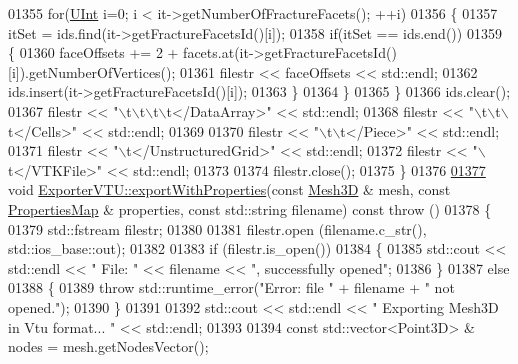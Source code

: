 \begin{DoxyCode}
01355         \textcolor{keywordflow}{for}(\hyperlink{namespaceFVCode3D_a4bf7e328c75d0fd504050d040ebe9eda}{UInt} i=0; i < it->getNumberOfFractureFacets(); ++i)
01356         \{
01357             itSet = ids.find(it->getFractureFacetsId()[i]);
01358             \textcolor{keywordflow}{if}(itSet == ids.end())
01359             \{
01360                 faceOffsets += 2 + facets.at(it->getFractureFacetsId()[i]).getNumberOfVertices();
01361                 filestr << faceOffsets << std::endl;
01362                 ids.insert(it->getFractureFacetsId()[i]);
01363             \}
01364         \}
01365     \}
01366     ids.clear();
01367     filestr << \textcolor{stringliteral}{"\(\backslash\)t\(\backslash\)t\(\backslash\)t\(\backslash\)t</DataArray>"} << std::endl;
01368     filestr << \textcolor{stringliteral}{"\(\backslash\)t\(\backslash\)t\(\backslash\)t</Cells>"} << std::endl;
01369 
01370     filestr << \textcolor{stringliteral}{"\(\backslash\)t\(\backslash\)t</Piece>"} << std::endl;
01371     filestr << \textcolor{stringliteral}{"\(\backslash\)t</UnstructuredGrid>"} << std::endl;
01372     filestr << \textcolor{stringliteral}{"\(\backslash\)t</VTKFile>"} << std::endl;
01373 
01374     filestr.close();
01375 \}
01376 
\hypertarget{ExportVTU_8cpp_source.tex_l01377}{}\hyperlink{classFVCode3D_1_1ExporterVTU_a0013b4e717db2c4719b00a5122f7b405}{01377} \textcolor{keywordtype}{void} \hyperlink{classFVCode3D_1_1ExporterVTU_a12240c4de9e7b3a5bf8f513c873c4547}{ExporterVTU::exportWithProperties}(\textcolor{keyword}{const} 
      \hyperlink{classFVCode3D_1_1Mesh3D}{Mesh3D} & mesh, \textcolor{keyword}{const} \hyperlink{classFVCode3D_1_1PropertiesMap}{PropertiesMap} & properties, \textcolor{keyword}{const} std::string filename) \textcolor{keyword}{const} \textcolor{keywordflow}{throw}
      ()
01378 \{
01379     std::fstream filestr;
01380 
01381     filestr.open (filename.c\_str(), std::ios\_base::out);
01382 
01383     \textcolor{keywordflow}{if} (filestr.is\_open())
01384     \{
01385         std::cout << std::endl << \textcolor{stringliteral}{" File: "} << filename << \textcolor{stringliteral}{", successfully opened"};
01386     \}
01387     \textcolor{keywordflow}{else}
01388     \{
01389         \textcolor{keywordflow}{throw} std::runtime\_error(\textcolor{stringliteral}{"Error: file "} + filename + \textcolor{stringliteral}{" not opened."});
01390     \}
01391 
01392     std::cout << std::endl << \textcolor{stringliteral}{" Exporting Mesh3D in Vtu format... "} << std::endl;
01393 
01394     \textcolor{keyword}{const} std::vector<Point3D> & nodes = mesh.getNodesVector();

\end{DoxyCode}
